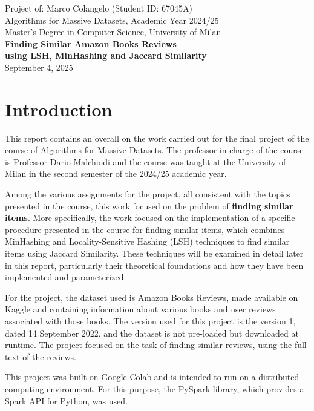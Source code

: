 \documentclass[12pt, a4paper]{article}
\begin{document}
\thispagestyle{empty}
\begin{center}
    \vspace*{3cm}
    {\large Project of: Marco Colangelo (Student ID: 67045A)}\\[0.3cm]
    {\large Algorithms for Massive Datasets, Academic Year 2024/25}\\[0.3cm]
    {\large Master's Degree in Computer Science, University of Milan}\\[1.2cm]

    {\LARGE\bfseries
    Finding Similar Amazon Books Reviews\\
    using LSH, MinHashing and Jaccard Similarity}\\[1.2cm]

    {\large September 4, 2025}
\end{center}

\setcounter{page}{1}

\section{Introduction}
This report contains an overall on the work carried out for the final project of the course of Algorithms for Massive Datasets. The professor in charge of the course is Professor Dario Malchiodi and the course was taught at the University of Milan in the second semester of the 2024/25 academic year.

Among the various assignments for the project, all consistent with the topics presented in the course, this work focused on the problem of \textbf{finding similar items}. More specifically, the work focused on the implementation of a specific procedure presented in the course for finding similar items, which combines MinHashing and Locality-Sensitive Hashing (LSH) techniques to find similar items using Jaccard Similarity. These techniques will be examined in detail later in this report, particularly their theoretical foundations and how they have been implemented and parameterized.

For the project, the dataset used is Amazon Books Reviews, made available on Kaggle and containing information about various books and user reviews associated with those books. The version used for this project is the version 1, dated 14 September 2022, and the dataset is not pre-loaded but downloaded at runtime. The project focused on the task of finding similar reviews, using the full text of the reviews.

This project was built on Google Colab and is intended to run on a distributed computing environment. For this purpose, the PySpark library, which provides a Spark API for Python, was used. 
\end{document}
